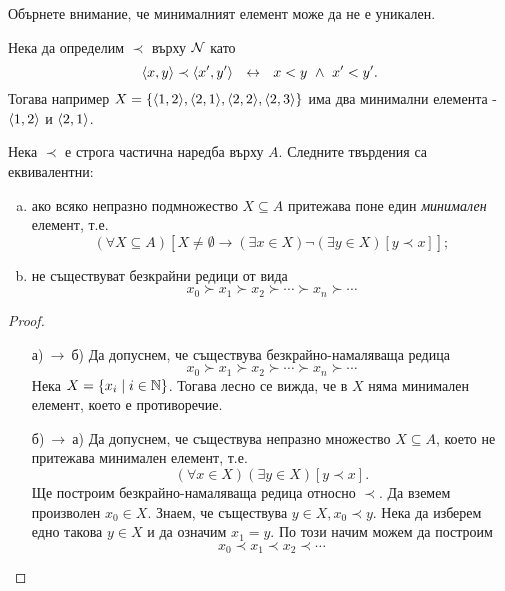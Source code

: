 Обърнете внимание, че минималният елемент може да не е уникален.
\begin{example}
  Нека да определим $\prec$ върху $\mathcal{N}$ като
  \[\langle{x,y}\rangle\prec\langle{x^\prime,y^\prime}\rangle\ \ \leftrightarrow\ \ x < y\ \wedge\ x^\prime < y^\prime.\]
  Тогава например $X = \{\langle{1,2}\rangle,\langle{2,1}\rangle,\langle{2,2}\rangle,\langle{2,3}\rangle\}$
  има два минимални елемента - $\langle{1,2}\rangle$ и $\langle{2,1}\rangle$.
\end{example}


\begin{prop}
  Нека $\prec$ е строга частична наредба върху $A$.
  Следните твърдения са  еквивалентни:
  \begin{enumerate}[a)]
  \item
    ако всяко непразно подмножество $X\subseteq A$ притежава поне един {\em минимален} елемент, т.е.
    \[(\forall X\subseteq A)[X\neq\emptyset \rightarrow (\exists x\in X)\neg(\exists y\in X)[y \prec x]];\]
  \item
    не съществуват безкрайни редици от вида
    \[x_0 \succ x_1 \succ x_2 \succ \cdots \succ x_n \succ \cdots\]
  \end{enumerate}
\end{prop}
\begin{proof}
  \begin{enumerate}
  \item[а)$\ \to\ $б)]
    Да допуснем, че съществува безкрайно-намаляваща редица
    \[x_0 \succ x_1 \succ x_2 \succ \cdots \succ x_n \succ \cdots\]
    Нека $X = \{x_i\mid i \in \mathbb{N}\}$.
    Тогава лесно се вижда, че в $X$ няма минимален елемент, което е противоречие.
  \item[б)$\ \to\ $а)]
    Да допуснем, че съществува непразно множество $X \subseteq A$, което не притежава минимален елемент, т.е.
    \[(\forall x\in X)(\exists y\in X)[y \prec x].\]
    Ще построим безкрайно-намаляваща редица относно $\prec$.
    Да вземем произволен $x_0 \in X$. 
    Знаем, че съществува $y \in X, x_0 \prec y$.
    Нека да изберем едно такова $y\in X$ и да означим $x_1 = y$.
    По този начим можем да построим
    \[x_0 \prec x_1 \prec x_2 \prec \cdots \]
  \end{enumerate}
\end{proof}

